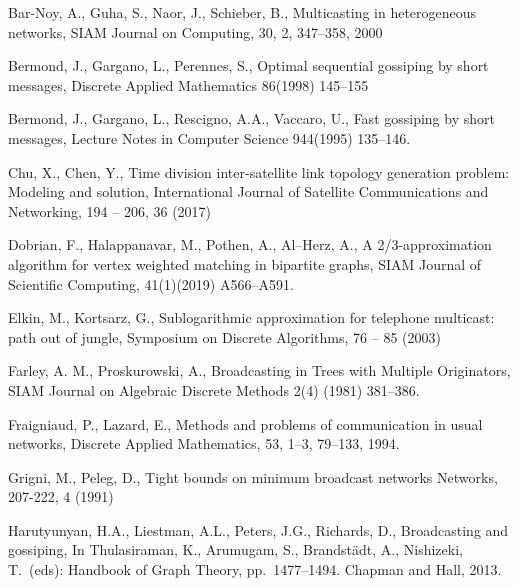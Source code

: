 \documentclass[preprint,12pt, review]{elsarticle}
\begin{document}
\begin{thebibliography}{}
%
%
Bar-Noy, A., Guha, S., Naor, J., Schieber, B.,
Multicasting in heterogeneous networks,
SIAM Journal on Computing, 30, 2, 347--358, 2000

Bermond, J., Gargano, L., Perennes, S.,
Optimal sequential gossiping by short messages,
Discrete Applied Mathematics 86(1998) 145--155

Bermond, J., Gargano, L., Rescigno, A.A., Vaccaro, U.,
Fast gossiping by short messages,
Lecture Notes in Computer Science 944(1995) 135--146.

Chu, X., Chen, Y.,
Time division inter-satellite link topology generation problem: Modeling and solution,
International Journal of Satellite Communications and Networking, 194 -- 206, 36 (2017)


Dobrian, F., Halappanavar, M., Pothen, A., Al--Herz, A., 
A 2/3-approximation algorithm for vertex weighted matching in bipartite graphs,
SIAM Journal of Scientific Computing, 41(1)(2019) A566--A591.

Elkin, M., Kortsarz, G.,
Sublogarithmic approximation for telephone multicast: path out of jungle,
Symposium on Discrete Algorithms, 76 -- 85 (2003)

Farley, A. M., Proskurowski, A.,
Broadcasting in Trees with Multiple Originators,
SIAM Journal on Algebraic Discrete Methods 2(4) (1981) 381--386.

Fraigniaud, P., Lazard, E.,
Methods and problems of communication in usual networks,
Discrete Applied Mathematics, 53, 1--3, 79--133, 1994.

Grigni, M., Peleg, D.,
Tight bounds on minimum broadcast networks
Networks, 207-222, 4 (1991)

Harutyunyan, H.A., Liestman, A.L., Peters, J.G., Richards, D.,
Broadcasting and gossiping, In Thulasiraman, K., Arumugam, S., Brandst\"{a}dt, A., Nishizeki, T.\ (eds): Handbook of Graph Theory, pp.\ 1477--1494. Chapman and Hall, 2013.


\end{thebibliography}
\end{document}
